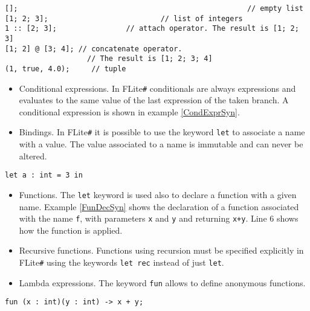 \documentclass[]{article}
\begin{document}
		\begin{lstlisting}[caption={Lists and tuples}, label=ListTuple]
[];														// empty list
[1; 2; 3];							// list of integers
1 :: [2; 3]; 				// attach operator. The result is [1; 2; 3]
[1; 2] @ [3; 4]; // concatenate operator.
   				   // The result is [1; 2; 3; 4]
(1, true, 4.0);		// tuple
		\end{lstlisting}
	
		\begin{itemize}
			\item Conditional expressions. In FLite\verb|#| conditionals are always expressions and evaluates to the same value of the last expression of the taken branch. A conditional expression is shown in example \ref{CondExprSyn}.
			\item Bindings. In FLite\verb|#| it is possible to use the keyword \lstinline|let| to associate a name with a value. The value associated to a name is immutable and can never be altered.
		\end{itemize}
	
		\begin{lstlisting}[caption={Binding}, label=Bind]
let a : int = 3 in
		\end{lstlisting}	
	
		\begin{itemize}		
			\item Functions. The \lstinline|let| keyword is used also to declare a function with a given name. Example \ref{FunDecSyn} shows the declaration of a function associated with the name \lstinline|f|, with parameters \lstinline|x| and \lstinline|y| and returning \lstinline|x+y|. Line $6$ shows how the function is applied.
			\item Recursive functions. Functions using recursion must be specified explicitly in FLite\verb|#| using the keywords \lstinline|let rec| instead of just \lstinline|let|.
			\item Lambda expressions. The keyword \lstinline|fun| allows to define anonymous functions.
		\end{itemize}
	
		\begin{lstlisting}[caption={Lambda expression}, label=LambdaExpr]
fun (x : int)(y : int) -> x + y;
		\end{lstlisting}	
		
\end{document}
